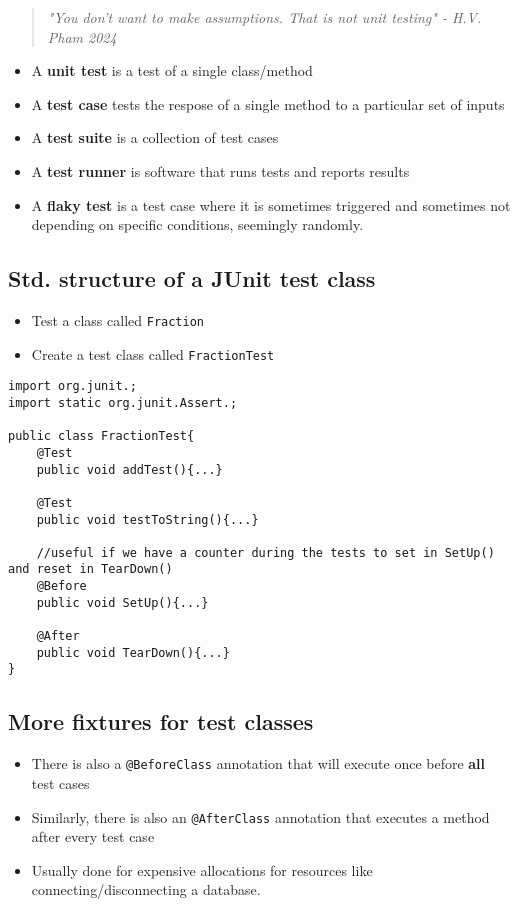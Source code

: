 \documentclass[12pt]{book}
\begin{document}
\begin{quote}
    \textit{"You don't want to make assumptions. That is not unit testing" - H.V. Pham 2024}
\end{quote}

\begin{itemize}
    \item A \textbf{unit test} is a test of a single class/method
    \item A \textbf{test case} tests the respose of a single method to a particular set of inputs
    \item A \textbf{test suite} is a collection of test cases
    \item A \textbf{test runner} is software that runs tests and reports results
    \item A \textbf{flaky test} is a test case where it is sometimes triggered and sometimes not depending on specific conditions, seemingly randomly.
\end{itemize}

\newpage
\subsection{Std. structure of a JUnit test class}

\begin{itemize}
    \item Test a class called \texttt{Fraction}
    \item Create a test class called \texttt{FractionTest}
\end{itemize}

\begin{lstlisting}
import org.junit.;
import static org.junit.Assert.;

public class FractionTest{
    @Test
    public void addTest(){...}

    @Test
    public void testToString(){...}

    //useful if we have a counter during the tests to set in SetUp() and reset in TearDown()
    @Before
    public void SetUp(){...}

    @After
    public void TearDown(){...}
}
\end{lstlisting}


\subsection{More fixtures for test classes}
\begin{itemize}
    \item There is also a \texttt{@BeforeClass} annotation that will execute once before \textbf{all} test cases
    \item Similarly, there is also an \texttt{@AfterClass} annotation that executes a method after every test case
    \item Usually done for expensive allocations for resources like connecting/disconnecting a database.
\end{itemize}
\end{document}
